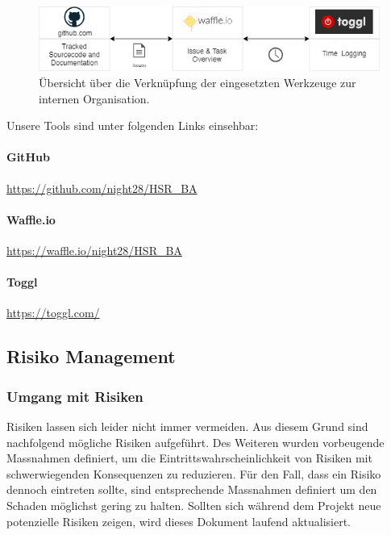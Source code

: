 \begin{figure}[H]
	\centering
	\includegraphics[width=13cm]{img/EingesetzteToolsZurOrganisation.png}
	\caption{Übersicht über die Verknüpfung der eingesetzten Werkzeuge zur internen Organisation.}
	\label{fig:Interne Organisationsstruktur}
\end{figure} 

Unsere Tools sind unter folgenden Links einsehbar:
\paragraph{GitHub} \href{https://github.com/night28/HSR\_BA}{https://github.com/night28/HSR\_BA} 

\paragraph{Waffle.io} \href{https://waffle.io/night28/HSR\_BA}{https://waffle.io/night28/HSR\_BA}

\paragraph{Toggl} \href{https://toggl.com/}{https://toggl.com/}
 
\subsection{Risiko Management}

\subsubsection{Umgang mit Risiken}
Risiken lassen sich leider nicht immer vermeiden. Aus diesem Grund sind nachfolgend mögliche Risiken aufgeführt. Des Weiteren wurden vorbeugende Massnahmen definiert, um die Eintrittswahrscheinlichkeit von Risiken mit schwerwiegenden Konsequenzen zu reduzieren. Für den Fall, dass ein Risiko dennoch eintreten sollte, sind entsprechende Massnahmen definiert um den Schaden möglichst gering zu halten.
Sollten sich während dem Projekt neue potenzielle Risiken zeigen, wird dieses Dokument laufend aktualisiert.

